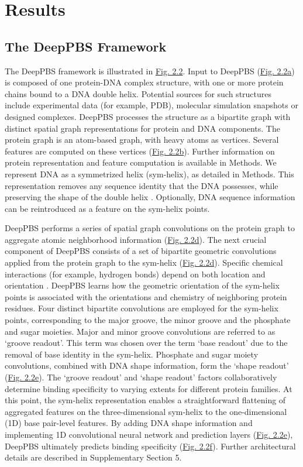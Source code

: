 \section{Results}
\subsection{The DeepPBS Framework}
The DeepPBS framework is illustrated in \hyperref[fig:pdna1]{Fig. 2.2}. Input to DeepPBS (\hyperref[fig:pdna1]{Fig. 2.2a}) is composed of one protein-DNA complex structure, with one or more protein chains bound to a DNA double helix. Potential sources for such structures include experimental data (for example, PDB\citep{berman2000protein}), molecular simulation snapshots or designed complexes. DeepPBS processes the structure as a bipartite graph with distinct spatial graph representations for protein and DNA components. The protein graph is an atom-based graph, with heavy atoms as vertices. Several features are computed on these vertices (\hyperref[fig:pdna1]{Fig. 2.2b}). Further information on protein representation and feature computation is available in Methods. We represent DNA as a symmetrized helix (sym-helix), as detailed in Methods. This representation removes any sequence identity that the DNA possesses, while preserving the shape of the double helix \citep{rohs2009role}. Optionally, DNA sequence information can be reintroduced as a feature on the sym-helix points.
\par
DeepPBS performs a series of spatial graph convolutions on the protein graph to aggregate atomic neighborhood information (\hyperref[fig:pdna1]{Fig. 2.2d}). The next crucial component of DeepPBS consists of a set of bipartite geometric convolutions applied from the protein graph to the sym-helix (\hyperref[fig:pdna1]{Fig. 2.2d}). Specific chemical interactions (for example, hydrogen bonds) depend on both location and orientation \citep{Helene1977}. DeepPBS learns how the geometric orientation of the sym-helix points is associated with the orientations and chemistry of neighboring protein residues. Four distinct bipartite convolutions are employed for the sym-helix points, corresponding to the major groove, the minor groove and the phosphate and sugar moieties. Major and minor groove convolutions are referred to as ‘groove readout’. This term was chosen over the term ‘base readout’ due to the removal of base identity in the sym-helix. Phosphate and sugar moiety convolutions, combined with DNA shape information, form the ‘shape readout’ (\hyperref[fig:pdna1]{Fig. 2.2e}). The ‘groove readout’ and ‘shape readout’ factors collaboratively determine binding specificity to varying extents for different protein families. At this point, the sym-helix representation enables a straightforward flattening of aggregated features on the three-dimensional sym-helix to the one-dimensional (1D) base pair-level features. By adding DNA shape information and implementing 1D convolutional neural network and prediction layers (\hyperref[fig:pdna1]{Fig. 2.2e}), DeepPBS ultimately predicts binding specificity (\hyperref[fig:pdna1]{Fig. 2.2f}). Further architectural details are described in Supplementary Section 5.
